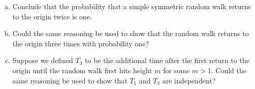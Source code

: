 \documentclass{article}
\begin{document}
\begin{enumerate}[(a)]
	\item Conclude that the probability that a simple symmetric random walk returns to the origin twice is one.

	\item Could the same reasoning be used to show that the random walk returns to the origin three times with probability one?

	\item Suppose we defined $T_3$ to be the additional time after the first return to the origin until the random walk first hits height $m$ for some $m>1.$ Could the same reasoning be used to show that $T_1$ and $T_3$ are independent?
		
\end{enumerate}
\end{document}

